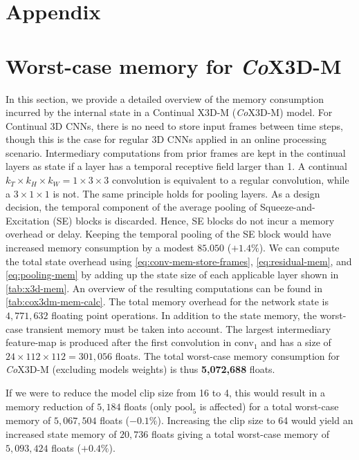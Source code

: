 \clearpage
\appendix
\renewcommand{\thesection}{\Alph{section}}

\DeclareRobustCommand{\highlight}[1]{{\sethlcolor{greycol}\hl{#1}}}
\newcommand{\mathcolorbox}[2]{\colorbox{#1}{$\displaystyle #2$}}


\section*{Appendix}

\section{Worst-case memory for \textit{Co}X3D-M}
In this section, we provide a detailed overview of the memory consumption incurred by the internal state in a Continual X3D-M (\textit{Co}X3D-M) model.
For Continual 3D CNNs, there is no need to store input frames between time steps, though this is the case for regular 3D CNNs applied in an online processing scenario. 
Intermediary computations from prior frames are kept in the continual layers as state if a layer has a temporal receptive field larger than 1. 
A continual $k_T \times k_H \times k_W = 1 \times 3 \times 3$ convolution is equivalent to a regular convolution, while a $3 \times 1 \times 1$ is not. 
The same principle holds for pooling layers. 
As a design decision, the temporal component of the average pooling of Squeeze-and-Excitation (SE) blocks is discarded. Hence, SE blocks do not incur a memory overhead or delay. 
Keeping the temporal pooling of the SE block would have increased memory consumption by a modest $85.050$ ($+1.4\%$).
We can compute the total state overhead using \cref{eq:conv-mem-store-frames}, \cref{eq:residual-mem}, and \cref{eq:pooling-mem} by adding up the state size of each applicable layer shown in \cref{tab:x3d-mem}.
%
An overview of the resulting computations can be found in \cref{tab:cox3dm-mem-calc}. 
The total memory overhead for the network state is $4{,}771{,}632$ floating point operations.
In addition to the state memory, the worst-case transient memory must be taken into account. 
The largest intermediary feature-map is produced after the first convolution in conv$_1$ and has a size of $24 \times 112 \times 112 = 301{,}056$ floats.
The total worst-case memory consumption for \textit{Co}X3D-M (excluding models weights) is thus \textbf{5,072,688} floats.

If we were to reduce the model clip size from 16 to 4, this would result in a memory reduction of $5{,}184$ floats (only $\text{pool}_5$ is affected) for a total worst-case memory of $5{,}067{,}504$ floats ($-0.1\%$). 
Increasing the clip size to 64 would yield an increased state memory of $20{,}736$ floats giving a total worst-case memory of $5{,}093{,}424$ floats ($+0.4\%$).

